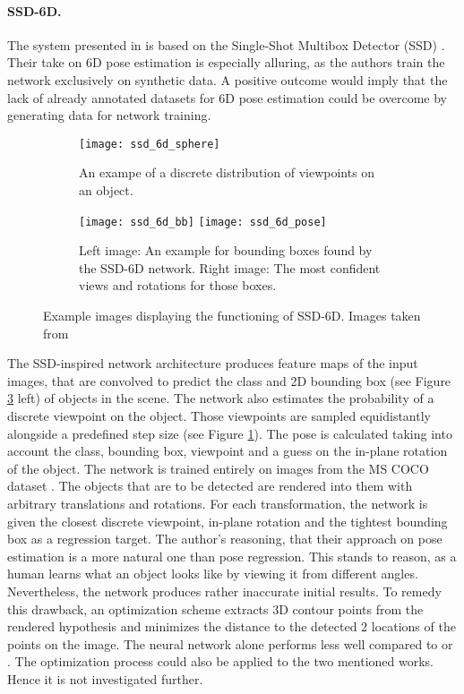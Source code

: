 \paragraph{SSD-6D.}

The system presented in \cite{ssd-6d} is based on the Single-Shot Multibox Detector (SSD) \cite{ssd}. Their take on 6D pose estimation is especially alluring, as the authors train the network exclusively on synthetic data. A positive outcome would imply that the lack of already annotated datasets for 6D pose estimation could be overcome by generating data for network training. 
\nnewline
\begin{figure}[!tbp]
	\centering
	\begin{subfigure}[b]{0.3\textwidth}
		\centering
    	\texttt{[image: ssd\_6d\_sphere]}
    	\caption{An exampe of a discrete distribution of viewpoints on an object.}
    	\label{fig:ssd6d_viewpoints}
	\end{subfigure}
	\hfill
	\begin{subfigure}[b]{0.6\textwidth}
		\centering
    	\texttt{[image: ssd\_6d\_bb]}
    	\texttt{[image: ssd\_6d\_pose]}
    	\caption{Left image: An example for bounding boxes found by the SSD-6D network. Right image: The most confident views and rotations for those boxes.}
    	\label{fig:ssd6d_detection}
	\end{subfigure}
	\caption{Example images displaying the functioning of SSD-6D. Images taken from \cite{ssd-6d}}
\end{figure}
The SSD-inspired network architecture produces feature maps of the input images, that are convolved to predict the class and 2D bounding box (see Figure \ref{fig:ssd6d_detection} left) of objects in the scene. The network also estimates the probability of a discrete viewpoint on the object. Those viewpoints are sampled equidistantly alongside a predefined step size (see Figure \ref{fig:ssd6d_viewpoints}). The pose is calculated taking into account the class, bounding box, viewpoint and a guess on the in-plane rotation of the object. The network is trained entirely on images from the MS COCO dataset \cite{mscoco}. The objects that are to be detected are rendered into them with arbitrary translations and rotations. For each transformation, the network is given the closest discrete viewpoint, in-plane rotation and the tightest bounding box as a regression target.
\nnewline
The author's reasoning, that their approach on pose estimation is a more natural one than pose regression. This stands to reason, as a human learns what an object looks like by viewing it from different angles. Nevertheless, the network produces rather inaccurate initial results.  To remedy this drawback, an optimization scheme extracts 3D contour points from the rendered hypothesis and minimizes the distance to the detected 2 locations of the points on the image. 
\nnewline
The neural network alone performs less well compared to \cite{brachmann1} or \cite{bb8}. The optimization process could also be applied to the two mentioned works. Hence it is not investigated further. 


